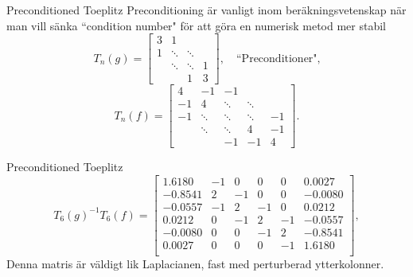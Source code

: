 \documentclass{beamer}
\begin{document}
\begin{frame}{Preconditioned Toeplitz}
    Preconditioning är vanligt inom beräkningsvetenskap när man vill sänka ``condition number" för att göra en numerisk metod mer stabil
\begin{equation}
T_n(g) = 
\begin{bmatrix}
3 & 1 &  &  \\
1 & \ddots&\ddots & \\
& \ddots &\ddots & 1\\
 &  & 1 & 3
\end{bmatrix}, \quad \text{``Preconditioner",}
\end{equation}
\begin{equation}
T_n(f) = 
\left[
\begin{array}{rrrrr}
4 & -1 & -1 & & \\
-1 & 4 & \ddots & \ddots & \\
-1 & \ddots & \ddots & \ddots & -1 \\
& \ddots & \ddots & 4 & -1 \\
& & -1 & -1 & 4
\end{array}
\right].
\end{equation}
\end{frame}

\begin{frame}{Preconditioned Toeplitz}
    \begin{equation}
T_6(g)^{-1}T_6(f) = 
\left[
\begin{array}{rrrrrr}
  1.6180  & -1       &  0       &  0       &  0       &  0.0027 \\
 -0.8541  &  2       & -1       &  0       &  0       & -0.0080 \\
 -0.0557   & -1       &  2       & -1       &  0       &  0.0212 \\
  0.0212  &  0       & -1       &  2       & -1       & -0.0557  \\
 -0.0080  &  0       &  0       & -1       &  2       & -0.8541 \\
  0.0027  &  0       &  0       &  0       & -1       &  1.6180 \\
\end{array}
\right],
\label{Precond example 6x6}
\end{equation}
Denna matris är väldigt lik Laplacianen, fast med perturberad ytterkolonner.
\end{frame}
\end{document}
